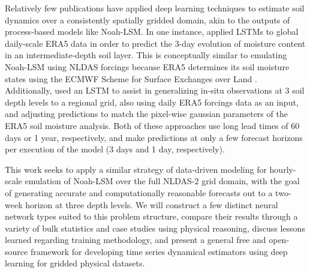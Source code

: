Relatively few publications have applied deep learning techniques to estimate soil dynamics over a consistently spatially gridded domain, akin to the outputs of process-based models like Noah-LSM.  In one instance, \citep{filipovic_regional_2022} applied LSTMs to global daily-scale ERA5 data in order to predict the 3-day evolution of moisture content in an intermediate-depth soil layer. This is conceptually similar to emulating Noah-LSM using NLDAS forcings because ERA5 determines its soil moisture states using the ECMWF Scheme for Surface Exchanges over Land \citep{balsamo_revised_2009}. Additionally, \citep{o_global_2021} used an LSTM to assist in generalizing in-situ observations at 3 soil depth levels to a regional grid, also using daily ERA5 forcings data as an input, and adjusting predictions to match the pixel-wise gaussian parameters of the ERA5 soil moisture analysis. Both of these approaches use long lead times of 60 days or 1 year, respectively, and make predictions at only a few forecast horizons per execution of the model (3 days and 1 day, respectively).

This work seeks to apply a similar strategy of data-driven modeling for hourly-scale emulation of Noah-LSM over the full NLDAS-2 grid domain, with the goal of generating accurate and computationally reasonable forecasts out to a two-week horizon at three depth levels. We will construct a few distinct neural network types suited to this problem structure, compare their results through a variety of bulk statistics and case studies using physical reasoning, discuss lessons learned regarding training methodology, and present a general free and open-source framework for developing time series dynamical estimators using deep learning for gridded physical datasets.
